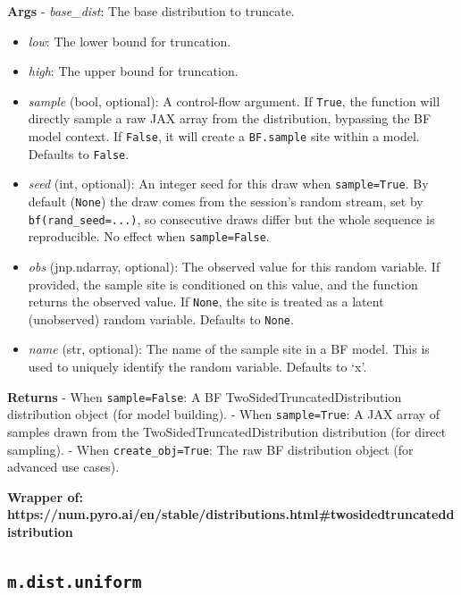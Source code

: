 \documentclass[
  letterpaper,
  DIV=11,
  numbers=noendperiod]{scrartcl}
\begin{document}
\textbf{Args} - \emph{base\_dist}: The base distribution to truncate.

\begin{itemize}
\item
  \emph{low}: The lower bound for truncation.
\item
  \emph{high}: The upper bound for truncation.
\item
  \emph{sample} (bool, optional): A control-flow argument. If
  \texttt{True}, the function will directly sample a raw JAX array from
  the distribution, bypassing the BF model context. If \texttt{False},
  it will create a \texttt{BF.sample} site within a model. Defaults to
  \texttt{False}.
\item
  \emph{seed} (int, optional): An integer seed for this draw when
  \texttt{sample=True}. By default (\texttt{None}) the draw comes from
  the session's random stream, set by \texttt{bf(rand\_seed=...)}, so
  consecutive draws differ but the whole sequence is reproducible. No
  effect when \texttt{sample=False}.
\item
  \emph{obs} (jnp.ndarray, optional): The observed value for this random
  variable. If provided, the sample site is conditioned on this value,
  and the function returns the observed value. If \texttt{None}, the
  site is treated as a latent (unobserved) random variable. Defaults to
  \texttt{None}.
\item
  \emph{name} (str, optional): The name of the sample site in a BF
  model. This is used to uniquely identify the random variable. Defaults
  to `x'.
\end{itemize}

\textbf{Returns} - When \texttt{sample=False}: A BF
TwoSidedTruncatedDistribution distribution object (for model building).
- When \texttt{sample=True}: A JAX array of samples drawn from the
TwoSidedTruncatedDistribution distribution (for direct sampling). - When
\texttt{create\_obj=True}: The raw BF distribution object (for advanced
use cases).

\textbf{Wrapper of:
https://num.pyro.ai/en/stable/distributions.html\#twosidedtruncateddistribution}

\subsection{\texorpdfstring{\texttt{m.dist.uniform}}{m.dist.uniform}}\label{uniform}
\end{document}
